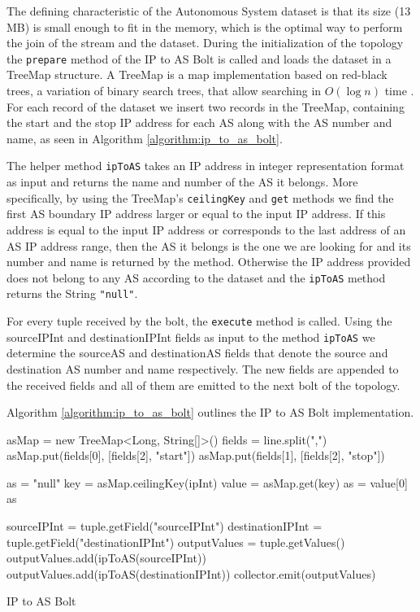 The defining characteristic of the Autonomous System dataset is that its size (13 MB) is small enough to fit in the memory, which is the optimal way to perform the join of the stream and the dataset. During the initialization of the topology the \texttt{prepare} method of the IP to AS Bolt is called and loads the dataset in a TreeMap structure. A TreeMap is a map implementation based on red-black trees, a variation of binary search trees, that allow searching in $O(\log{n})$ time \cite{treemap}. For each record of the dataset we insert two records in the TreeMap, containing the start and the stop IP address for each AS along with the AS number and name, as seen in Algorithm \ref{algorithm:ip_to_as_bolt}.

The helper method \texttt{ipToAS} takes an IP address in integer representation format as input and returns the name and number of the AS it belongs. More specifically, by using the TreeMap's \texttt{ceilingKey} and \texttt{get} methods we find the first AS boundary IP address larger or equal to the input IP address. If this address is equal to the input IP address or corresponds to the last address of an AS IP address range, then the AS it belongs is the one we are looking for and its number and name is returned by the method. Otherwise the IP address provided does not belong to any AS according to the dataset and the \texttt{ipToAS} method returns the String \texttt{"null"}.

For every tuple received by the bolt, the \texttt{execute} method is called. Using the sourceIPInt and destinationIPInt fields as input to the method \texttt{ipToAS} we determine the sourceAS and destinationAS fields that denote the source and destination AS number and name respectively. The new fields are appended to the received fields and all of them are emitted to the next bolt of the topology.

Algorithm \ref{algorithm:ip_to_as_bolt} outlines the IP to AS Bolt implementation.

\clearpage 

\begin{algorithm}[H]
\begin{algorithmic}[1]
\State asMap = new TreeMap<Long, String[]>()
\State fields = line.split(",")
\State asMap.put(fields[0], [fields[2], "start"])
\State asMap.put(fields[1], [fields[2], "stop"])
\EndFor
\EndFunction

\State as = "null"
\State key = asMap.ceilingKey(ipInt)
\State value = asMap.get(key)
\State as = value[0]
\EndIf
\EndIf
\Return as
\EndFunction

\State sourceIPInt = tuple.getField("sourceIPInt")
\State destinationIPInt = tuple.getField("destinationIPInt")
\State outputValues = tuple.getValues()
\State outputValues.add(ipToAS(sourceIPInt))
\State outputValues.add(ipToAS(destinationIPInt))
\State collector.emit(outputValues)
\EndFunction
\end{algorithmic}
\caption{IP to AS Bolt}
\label{algorithm:ip_to_as_bolt}
\end{algorithm}

